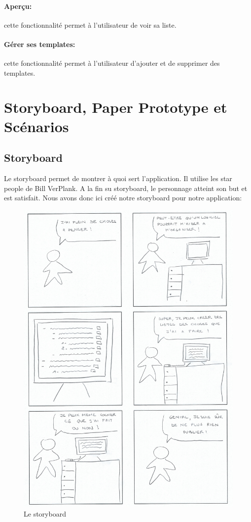 \documentclass[a4paper,10pt]{article}
\begin{document}
\paragraph{Aperçu:} cette fonctionnalité permet à l'utilisateur de voir sa liste.
\paragraph{Gérer ses templates:} cette fonctionnalité permet à l'utilisateur d'ajouter et de supprimer des templates.

\newpage
\section{Storyboard, Paper Prototype et Scénarios}

\subsection{Storyboard}
Le storyboard permet de montrer à quoi sert l'application. Il utilise les star people de Bill VerPlank. A la fin su storyboard, le personnage atteint son but et est satisfait. Nous avons donc ici créé notre storyboard pour notre application:
\begin{figure}[H]
    \center
    \includegraphics[width=13.9cm]{Images/storyboard.png}
    \caption{Le storyboard}
\end{figure}
\end{document}
